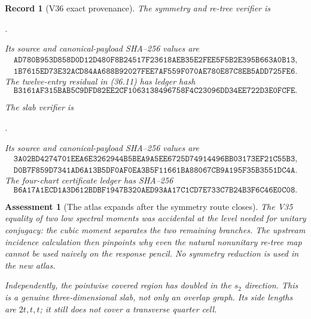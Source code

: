 \documentclass[11pt,oneside]{article}
\newtheorem{assessment}[theorem]{Assessment}
\newtheorem{record}[theorem]{Record}
\theoremstyle{definition}
\theoremstyle{remark}
\begin{document}
\begin{record}[V36 exact provenance]
\label{rec:newv36-provenance}
The symmetry and re-tree verifier is
\begin{center}
\footnotesize
{}.
\end{center}
Its source and canonical-payload SHA--256 values are
\[
\begin{gathered}
\texttt{AD780B953D858D0D12D480F8B24517F23618AEB35E2FEE5F5B2E395B663A0B13},\\
\texttt{1B7615ED73E32ACD84AA688B92027FEE7AF559F070AE780E87C8EB5ADD725FE6}.
\end{gathered}                                         \tag{36.26}
\]
The twelve-entry residual in (36.11) has ledger hash
\[
\texttt{B3161AF315BAB5C9DFD82EE2CF1063138496758F4C23096DD34EE722D3E0FCFE}.
                                                               \tag{36.27}
\]

The slab verifier is
\begin{center}
\footnotesize
{}.
\end{center}
Its source and canonical-payload SHA--256 values are
\[
\begin{gathered}
\texttt{3A02BD4274701EEA6E3262944B5BEA9A5EE6725D74914496BB03173EF21C55B3},\\
\texttt{D0B7F859D7341AD6A13B5DF0AF0EA3B5F11661BA88067CB9A195F35B3551DC4A}.
\end{gathered}                                         \tag{36.28}
\]
The four-chart certificate ledger has SHA--256
\[
\texttt{B6A17A1ECD1A3D612BDBF1947B320AED93AA17C1CD7E733C7B24B3F6C46E0C08}.
                                                               \tag{36.29}
\]
\end{record}

\begin{assessment}[The atlas expands after the symmetry route closes]
\label{ass:newv36}
The V35 equality of two low spectral moments was accidental at the
level needed for unitary conjugacy: the cubic moment separates the
two remaining branches.  The upstream incidence calculation then
pinpoints why even the natural nonunitary re-tree map cannot be used
naively on the response pencil.  No symmetry reduction is used in
the new atlas.

Independently, the pointwise covered region has doubled in the
\(s_2\) direction.  This is a genuine three-dimensional slab, not
only an overlap graph.  Its side lengths are \(2t,t,t\); it still
does not cover a transverse quarter cell.
\end{assessment}
\end{document}
